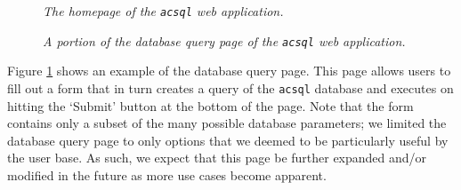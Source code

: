 \documentclass[10pt,journal,compsoc]{IEEEtran}
\begin{document}
\begin{figure}[!t]
\centering
{}
\caption{\textit{The homepage of the \texttt{acsql} web application.}}
\label{fig21}
\caption{\textit{A portion of the database query page of the \texttt{acsql} web application.}}
\label{fig22}
\end{figure}

Figure \ref{fig22} shows an example of the database query page.  This page allows users to fill out a form that in turn creates a query of the \texttt{acsql} database and executes
on hitting the `Submit' button at the bottom of the page.  Note that the form contains only a subset of the many possible database parameters; we limited the database query page to only
options that we deemed to be particularly useful by the user base.  As such, we expect that this page be further expanded and/or modified in the future as more use cases become apparent.
\end{document}

